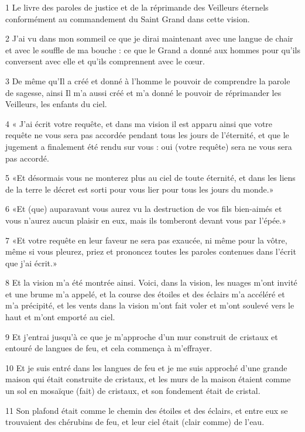 \par 1 Le livre des paroles de justice et de la réprimande des Veilleurs éternels conformément au commandement du Saint Grand dans cette vision.
\par 2 J'ai vu dans mon sommeil ce que je dirai maintenant avec une langue de chair et avec le souffle de ma bouche : ce que le Grand a donné aux hommes pour qu'ils conversent avec elle et qu'ils comprennent avec le cœur.
\par 3 De même qu'Il a créé et donné à l'homme le pouvoir de comprendre la parole de sagesse, ainsi Il m'a aussi créé et m'a donné le pouvoir de réprimander les Veilleurs, les enfants du ciel.
\par 4 « J'ai écrit votre requête, et dans ma vision il est apparu ainsi que votre requête ne vous sera pas accordée pendant tous les jours de l'éternité, et que le jugement a finalement été rendu sur vous : oui (votre requête) sera ne vous sera pas accordé.
\par 5 «Et désormais vous ne monterez plus au ciel de toute éternité, et dans les liens de la terre le décret est sorti pour vous lier pour tous les jours du monde.»
\par 6 «Et (que) auparavant vous aurez vu la destruction de vos fils bien-aimés et vous n'aurez aucun plaisir en eux, mais ils tomberont devant vous par l'épée.»
\par 7 «Et votre requête en leur faveur ne sera pas exaucée, ni même pour la vôtre, même si vous pleurez, priez et prononcez toutes les paroles contenues dans l'écrit que j'ai écrit.»
\par 8 Et la vision m'a été montrée ainsi. Voici, dans la vision, les nuages ​​m'ont invité et une brume m'a appelé, et la course des étoiles et des éclairs m'a accéléré et m'a précipité, et les vents dans la vision m'ont fait voler et m'ont soulevé vers le haut et m'ont emporté au ciel.
\par 9 Et j'entrai jusqu'à ce que je m'approche d'un mur construit de cristaux et entouré de langues de feu, et cela commença à m'effrayer.
\par 10 Et je suis entré dans les langues de feu et je me suis approché d'une grande maison qui était construite de cristaux, et les murs de la maison étaient comme un sol en mosaïque (fait) de cristaux, et son fondement était de cristal.
\par 11 Son plafond était comme le chemin des étoiles et des éclairs, et entre eux se trouvaient des chérubins de feu, et leur ciel était (clair comme) de l'eau.
